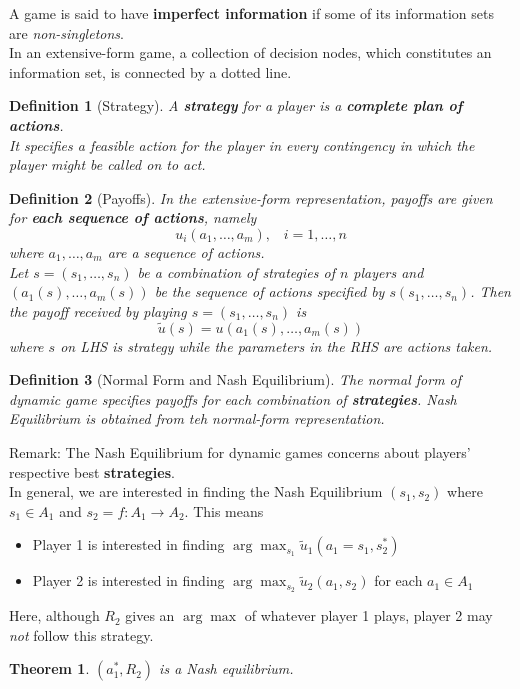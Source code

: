 \documentclass[12pt]{article}
\newtheorem{definition}{Definition}[section]
\newtheorem{theorem}{Theorem}[section]
\theoremstyle{definition}
\begin{document}
A game is said to have \textbf{imperfect information} if some of its information sets are \textit{non-singletons}.\\
In an extensive-form game, a collection of decision nodes, which constitutes an information set, is connected by a dotted line.
\begin{definition}[Strategy]
\normalfont A \textbf{strategy} for a player is a \textbf{complete plan of actions}.\\
It specifies a feasible action for the player in every contingency in which the player might be called on to act. 
\end{definition}
\begin{definition}[Payoffs]
\normalfont In the extensive-form representation, payoffs are given for \textbf{each sequence of actions}, namely
\[
u_i(a_1,\ldots, a_m), \;\;\;i=1,\ldots, n
\]
where $a_1,\ldots, a_m$ are a sequence of actions.\\
Let $s=(s_1,\ldots, s_n)$ be a combination of strategies of $n$ players and $(a_1(s), \ldots, a_m(s))$ be the sequence of actions specified by $s(s_1,\ldots, s_n)$. Then the payoff received by playing $s=(s_1,\ldots, s_n)$ is
\[
\tilde{u}(s)=u(a_1(s), \ldots, a_m(s))
\]
where $s$ on LHS is strategy while the parameters in the RHS are actions taken.
\end{definition}
\begin{definition}[Normal Form and Nash Equilibrium]
The normal form of dynamic game specifies payoffs for each combination of \textbf{strategies}. Nash Equilibrium is obtained from teh normal-form representation.
\end{definition}
Remark: The Nash Equilibrium for dynamic games concerns about players' respective best \textbf{strategies}.\\
In general, we are interested in finding the Nash Equilibrium $(s_1, s_2)$ where $s_1\in A_1$ and $s_2=f:A_1\to A_2$. This means
\begin{itemize}
  \item Player 1 is interested in finding $\arg\max_{s_1}\tilde{u}_1(a_1=s_1, s_2^\ast)$
  \item Player 2 is interested in finding $\arg\max_{s_2}\tilde{u}_2(a_1, s_2)$ for each $a_1 \in A_1$
\end{itemize}
Here, although $R_2$ gives an $\arg\max$ of whatever player 1 plays, player 2 may \textit{not} follow this strategy.
\begin{theorem}\normalfont $(a_1^\ast, R_2)$ is a Nash equilibrium.
\end{theorem}
\end{document}
